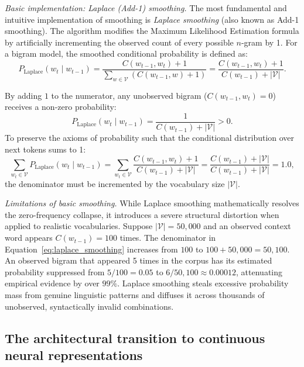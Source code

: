 \documentclass[../../../main.tex]{subfiles}
\begin{document}
\textit{Basic implementation: Laplace (Add-1) smoothing.} The most fundamental and intuitive implementation of smoothing is \textit{Laplace smoothing} (also known as Add-1 smoothing). The algorithm modifies the Maximum Likelihood Estimation formula by artificially incrementing the observed count of every possible $n$-gram by 1. For a bigram model, the smoothed conditional probability is defined as:
\begin{equation}
P_{\text{Laplace}}\left(w_t \mid w_{t-1}\right) = \frac{C\left(w_{t-1}, w_t\right) + 1}{\sum_{w \in \mathcal{V}} \left(C(w_{t-1}, w) + 1\right)} = \frac{C\left(w_{t-1}, w_t\right) + 1}{C\left(w_{t-1}\right) + |\mathcal{V}|}.
\label{eq:laplace_smoothing}
\end{equation}

By adding $1$ to the numerator, any unobserved bigram ($C(w_{t-1}, w_t) = 0$) receives a non-zero probability:
\begin{equation}
P_{\text{Laplace}}\left(w_t \mid w_{t-1}\right) = \frac{1}{C(w_{t-1}) + |\mathcal{V}|} > 0.
\end{equation}
To preserve the axioms of probability such that the conditional distribution over next tokens sums to 1:
\begin{equation}
\sum_{w_t \in \mathcal{V}} P_{\text{Laplace}}\left(w_t \mid w_{t-1}\right) = \sum_{w_t \in \mathcal{V}} \frac{C\left(w_{t-1}, w_t\right) + 1}{C\left(w_{t-1}\right) + |\mathcal{V}|} = \frac{C(w_{t-1}) + |\mathcal{V}|}{C(w_{t-1}) + |\mathcal{V}|} = 1.0,
\end{equation}
the denominator must be incremented by the vocabulary size $|\mathcal{V}|$.

\textit{Limitations of basic smoothing.} While Laplace smoothing mathematically resolves the zero-frequency collapse, it introduces a severe structural distortion when applied to realistic vocabularies. Suppose $|\mathcal{V}| = 50{,}000$ and an observed context word appears $C(w_{t-1}) = 100$ times. The denominator in Equation~\eqref{eq:laplace_smoothing} increases from $100$ to $100 + 50{,}000 = 50{,}100$. An observed bigram that appeared 5 times in the corpus has its estimated probability suppressed from $5/100 = 0.05$ to $6/50{,}100 \approx 0.00012$, attenuating empirical evidence by over $99\%$. Laplace smoothing steals excessive probability mass from genuine linguistic patterns and diffuses it across thousands of unobserved, syntactically invalid combinations.

\subsection{The architectural transition to continuous neural representations}
\label{subsec:bridge_to_neural}
\end{document}
